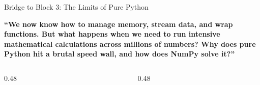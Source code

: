 \begin{frame}{Bridge to Block 3: The Limits of Pure Python}
  \begin{center}
    \vspace{0.15cm}
    \begin{tcolorbox}[enhanced,arc=2mm,boxrule=.6pt,colback=UpGradNight,colframe=AWSSquid,
      left=6mm,right=6mm,top=4mm,bottom=4mm,width=0.92\linewidth]
      {\UpGradDisplayFont\fontsize{11.5}{16}\selectfont\bfseries\color{white}
        “We now know how to manage memory, stream data, and wrap functions. But what happens when we need to run intensive mathematical calculations across millions of numbers? Why does pure Python hit a brutal speed wall, and how does NumPy solve it?”
      }
    \end{tcolorbox}
  \end{center}
  \vfill
  \begin{columns}[c,onlytextwidth]
    \begin{column}{0.48\textwidth}
    \end{column}
    \begin{column}{0.48\textwidth}
    \end{column}
  \end{columns}
\end{frame}
